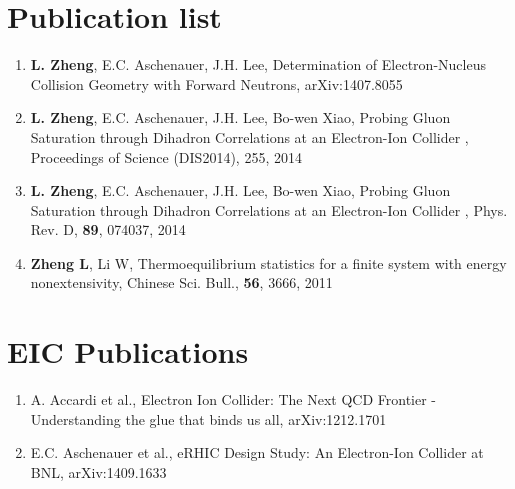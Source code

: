 
\section*{Publication list}

\begin{enumerate}

\item \textbf{L. Zheng}, E.C. Aschenauer, J.H. Lee, Determination of Electron-Nucleus Collision Geometry with Forward Neutrons,
  arXiv:1407.8055
  
\item \textbf{L. Zheng}, E.C. Aschenauer, J.H. Lee, Bo-wen Xiao, Probing Gluon Saturation through Dihadron Correlations at an Electron-Ion Collider ,
  Proceedings of Science (DIS2014), 255, 2014
  
\item \textbf{L. Zheng}, E.C. Aschenauer, J.H. Lee, Bo-wen Xiao, Probing Gluon Saturation through Dihadron Correlations at an Electron-Ion Collider ,
 Phys. Rev. D, \textbf{89}, 074037, 2014
 
\item \textbf{Zheng L}, Li W, Thermoequilibrium statistics for a finite system with energy nonextensivity,
Chinese Sci. Bull., \textbf{56}, 3666, 2011

\end{enumerate}


\section*{EIC Publications}
\begin{enumerate}
\item A. Accardi et al., Electron Ion Collider: The Next QCD Frontier - Understanding the glue that binds us all,
 arXiv:1212.1701
 
\item E.C. Aschenauer et al., eRHIC Design Study: An Electron-Ion Collider at BNL, arXiv:1409.1633

\end{enumerate}



